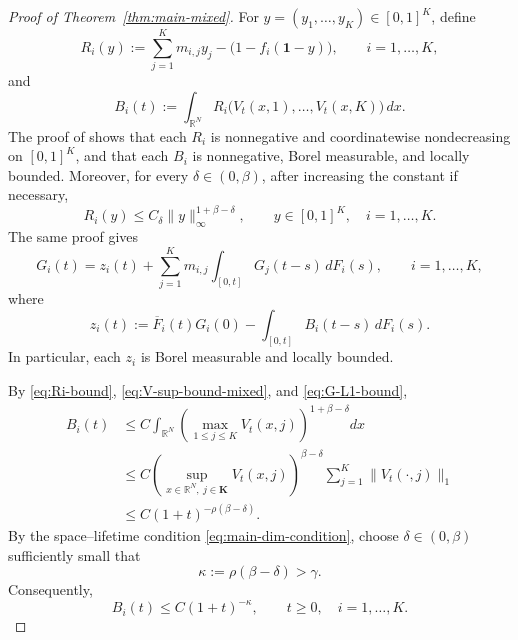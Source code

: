\documentclass[reqno,final,11pt]{amsart}
\newcommand{\R}{\mathbb R}
\newcommand{\Kk}{\mathbf K}
\newcommand{\one}{\mathbf 1}
\theoremstyle{plain}
\theoremstyle{definition}
\theoremstyle{remark}
\numberwithin{equation}{section}
\begin{document}
\begin{proof}[Proof of Theorem~\ref{thm:main-mixed}]
For \(y=(y_1,\dots,y_K)\in[0,1]^K\), define
\begin{equation}\label{eq:R-def-main}
  R_i(y):=\sum_{j=1}^K m_{i,j}y_j-\bigl(1-f_i(\one-y)\bigr),
  \qquad i=1,\dots,K,
\end{equation}
and
\begin{equation}\label{eq:B-def-main}
  B_i(t):=\int_{\R^N}R_i\bigl(V_t(x,1),\dots,V_t(x,K)\bigr)\,dx.
\end{equation}
The proof of \cite[Theorem~2.3]{KLRFiniteMean} shows that each \(R_i\) is nonnegative and coordinatewise nondecreasing on \([0,1]^K\), and that each \(B_i\) is nonnegative, Borel measurable, and locally bounded. Moreover, for every \(\delta\in(0,\beta)\), after increasing the constant if necessary,
\begin{equation}\label{eq:Ri-bound}
  R_i(y)\le C_\delta\|y\|_\infty^{1+\beta-\delta},
  \qquad y\in[0,1]^K,\quad i=1,\dots,K.
\end{equation}
The same proof gives
\begin{equation}\label{eq:G-renewal-nonlinear}
  G_i(t)
  =
  z_i(t)+\sum_{j=1}^K m_{i,j}\int_{[0,t]}G_j(t-s)\,dF_i(s),
  \qquad i=1,\dots,K,
\end{equation}
where
\begin{equation}\label{eq:z-main-def}
  z_i(t):=\overline F_i(t)G_i(0)-\int_{[0,t]}B_i(t-s)\,dF_i(s).
\end{equation}
In particular, each \(z_i\) is Borel measurable and locally bounded.

By \eqref{eq:Ri-bound}, \eqref{eq:V-sup-bound-mixed}, and \eqref{eq:G-L1-bound},
\[
\begin{split}
  B_i(t)
  &\le C\int_{\R^N}
  \left(\max_{1\le j\le K}V_t(x,j)\right)^{1+\beta-\delta}dx\\
  &\le
  C\left(\sup_{x\in\R^N,\ j\in\Kk}V_t(x,j)\right)^{\beta-\delta}
  \sum_{j=1}^K\|V_t(\cdot,j)\|_1\\
  &\le C(1+t)^{-\rho(\beta-\delta)}.
\end{split}
\]
By the space--lifetime condition \eqref{eq:main-dim-condition}, choose \(\delta\in(0,\beta)\) sufficiently small that
\begin{equation}\label{eq:kappa-choice}
  \kappa:=\rho(\beta-\delta)>\gamma.
\end{equation}
Consequently,
\begin{equation}\label{eq:B-kappa-bound}
  B_i(t)\le C(1+t)^{-\kappa},
  \qquad t\ge0,\quad i=1,\dots,K.
\end{equation}


\end{proof}
\end{document}

